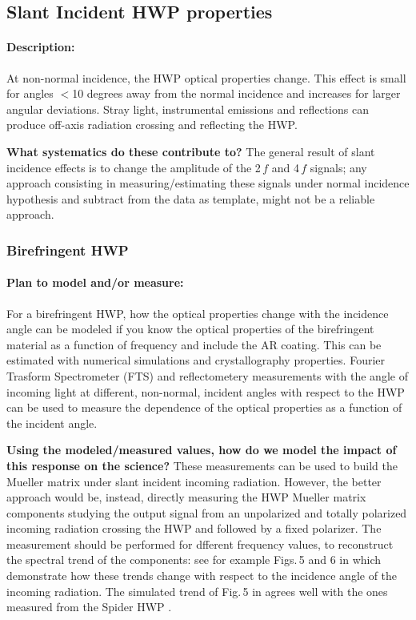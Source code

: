 \subsection{Slant Incident HWP properties}

\paragraph{Description:}
At non-normal incidence, the HWP optical properties change. This effect is small for angles $<$10 degrees away from the normal incidence and increases for larger angular deviations. Stray light, instrumental emissions and reflections can produce off-axis radiation crossing and reflecting the HWP.

\textbf{What systematics do these contribute to?} The general result of slant incidence effects is to change the amplitude of the 2$\,f$ and 4$\,f$ signals; any approach consisting in measuring/estimating these signals under normal incidence hypothesis and subtract from the data as template, might not be a reliable approach. 

\subsubsection{Birefringent HWP}\label{slant_biri}

\paragraph{Plan to model and/or measure:}
For a birefringent HWP, how the optical properties change with the incidence angle can be modeled if you know the optical properties of the birefringent material as a function of frequency and include the AR coating. This can be estimated with numerical simulations and crystallography properties. Fourier Trasform Spectrometer (FTS) and reflectometery measurements with the angle of incoming light at different, non-normal, incident angles with respect to the HWP can be used to measure the dependence of the optical properties as a function of the incident angle.

\textbf{Using the modeled/measured values, how do we model the impact of this response on the science?}
These measurements can be used to build the Mueller matrix under slant incident incoming radiation. However, the better approach would be, instead, directly measuring the HWP Mueller matrix components studying the output signal from an unpolarized and totally polarized incoming radiation crossing the HWP and followed by a fixed polarizer. The measurement should be performed for dfferent frequency values, to reconstruct the spectral trend of the components: see for example Figs.\,5 and 6 in \cite{Salatino17} which demonstrate how these trends change with respect to the incidence angle of the incoming radiation. The simulated trend of Fig.\,5 in \cite{Salatino17} agrees well with the ones measured from the Spider HWP \cite{Bryan10}.



